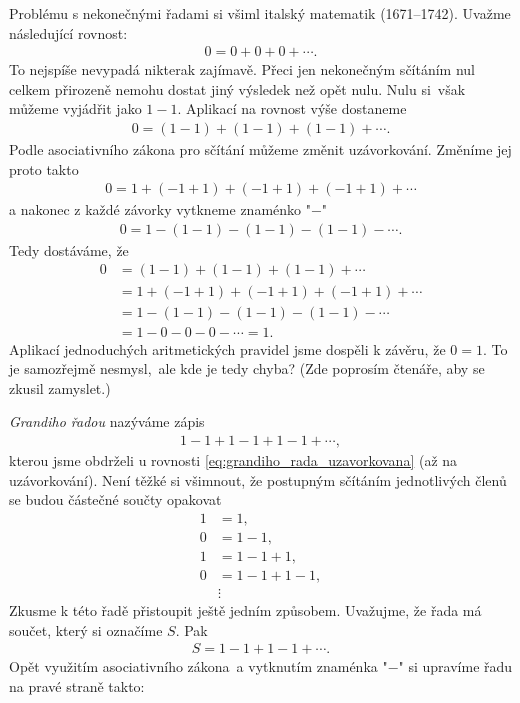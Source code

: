 Problému s nekonečnými řadami si všiml italský matematik  (1671--1742). Uvažme následující rovnost:
\begin{align*}
0=0+0+0+\cdots .
\end{align*}
To nejspíše nevypadá nikterak zajímavě. Přeci jen nekonečným sčítáním nul celkem přirozeně nemohu dostat jiný výsledek než opět nulu. Nulu si~však můžeme vyjádřit jako $1-1$. Aplikací na rovnost výše dostaneme
\begin{align}
\label{eq:grandiho_rada_uzavorkovana}
0=(1-1)+(1-1)+(1-1)+\cdots .
\end{align}
Podle asociativního zákona pro sčítání můžeme změnit uzávorkování. Změníme jej proto takto
\begin{align*}
0=1+(-1+1)+(-1+1)+(-1+1)+\cdots
\end{align*}
a nakonec z každé závorky vytkneme znaménko "$-$"
\begin{align*}
0=1-(1-1)-(1-1)-(1-1)-\cdots .
\end{align*}
Tedy dostáváme, že
\begin{align*}
0&=(1-1)+(1-1)+(1-1)+\cdots \\ &= 1+(-1+1)+(-1+1)+(-1+1)+\cdots \\ &= 1-(1-1)-(1-1)-(1-1)-\cdots \\ &= 1-0-0-0-\cdots = 1 .
\end{align*}
Aplikací jednoduchých aritmetických pravidel jsme dospěli k závěru, že $0=1$. To je samozřejmě nesmysl,~ale kde je tedy chyba? (Zde poprosím čtenáře, aby se zkusil zamyslet.)\par
\emph{Grandiho řadou} nazýváme zápis
\begin{align*}
1-1+1-1+1-1+\cdots ,
\end{align*}
kterou jsme obdrželi u rovnosti \eqref{eq:grandiho_rada_uzavorkovana} (až na uzávorkování). Není těžké si všimnout, že postupným sčítáním jednotlivých členů se budou částečné součty opakovat
\begin{align*}
1&=1 ,\\
0&=1-1 ,\\
1&=1-1+1 ,\\
0&=1-1+1-1 ,\\
&\vdots
\end{align*}
Zkusme k této řadě přistoupit ještě jedním způsobem. Uvažujme, že řada má součet, který si označíme $S$. Pak
\begin{align*}
S=1-1+1-1+\cdots .
\end{align*}
Opět využitím asociativního zákona~a vytknutím znaménka "$-$" si upravíme řadu na pravé straně takto:
